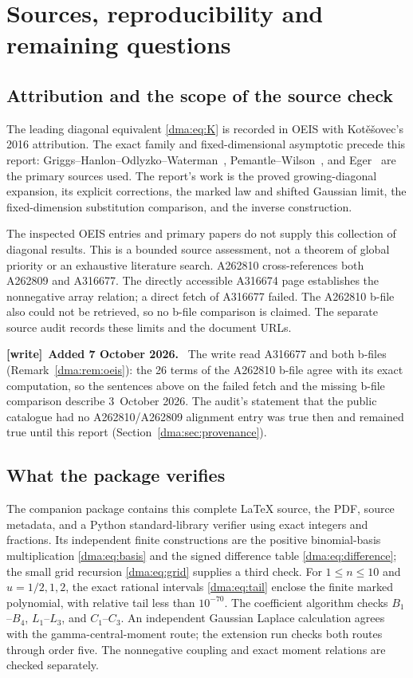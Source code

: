 \documentclass[11pt,letterpaper]{article}
\theoremstyle{remark}\newtheorem{remark}[theorem]{Remark}
\newenvironment{writenote}[1][]{\par\smallskip\begingroup\small
 \noindent\textbf{[write]}\if\relax\detokenize{#1}\relax\else~\textbf{#1.}\fi\ }%
 {\par\endgroup\smallskip}
\begin{document}
\section{Sources, reproducibility and remaining questions}\label{dma:sec:scope}
\subsection{Attribution and the scope of the source check}
The leading diagonal equivalent \eqref{dma:eq:K} is recorded in OEIS with Kot\v{e}\v{s}ovec's 2016 attribution. The exact family and fixed-dimensional asymptotic precede this report: Griggs--Hanlon--Odlyzko--Waterman~\cite{ghow}, Pemantle--Wilson~\cite{pw}, and Eger~\cite{eger} are the primary sources used. The report's work is the proved growing-diagonal expansion, its explicit corrections, the marked law and shifted Gaussian limit, the fixed-dimension substitution comparison, and the inverse construction.

The inspected OEIS entries and primary papers do not supply this collection of diagonal results. This is a bounded source assessment, not a theorem of global priority or an exhaustive literature search. A262810 cross-references both A262809 and A316677. The directly accessible A316674 page establishes the nonnegative array relation; a direct fetch of A316677 failed. The A262810 b-file also could not be retrieved, so no b-file comparison is claimed. The separate source audit records these limits and the document URLs.

\begin{writenote}[Added 7 October 2026]
The write read A316677 and both b-files (Remark~\ref{dma:rem:oeis}): the 26
terms of the A262810 b-file agree with its exact computation, so the
sentences above on the failed fetch and the missing b-file comparison
describe 3~October 2026. The audit's statement that the public catalogue had
no A262810/A262809 alignment entry was true then and remained true until this
report (Section~\ref{dma:sec:provenance}).
\end{writenote}

\subsection{What the package verifies}
The companion package contains this complete \LaTeX{} source, the PDF, source metadata, and a Python standard-library verifier using exact integers and fractions. Its independent finite constructions are the positive binomial-basis multiplication \eqref{dma:eq:basis} and the signed difference table \eqref{dma:eq:difference}; the small grid recursion \eqref{dma:eq:grid} supplies a third check. For $1\leq n\leq10$ and $u=1/2,1,2$, the exact rational intervals \eqref{dma:eq:tail} enclose the finite marked polynomial, with relative tail less than $10^{-70}$. The coefficient algorithm checks $B_1$--$B_4$, $L_1$--$L_3$, and $C_1$--$C_3$. An independent Gaussian Laplace calculation agrees with the gamma-central-moment route; the extension run checks both routes through order five. The nonnegative coupling and exact moment relations are checked separately.
\end{document}
